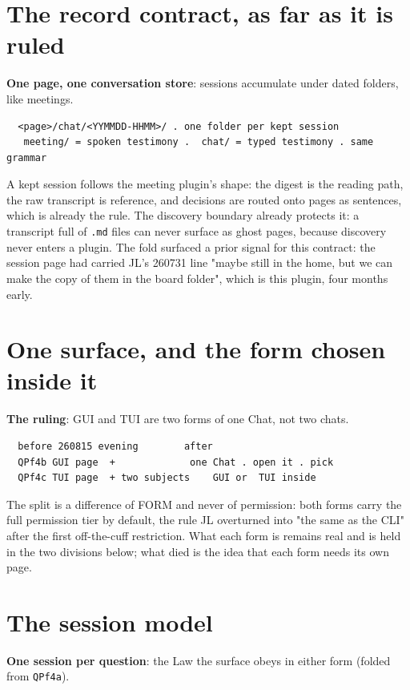 
\section{The record contract, as far as it is ruled}
\textbf{One page, one conversation store}: sessions accumulate under dated folders, like meetings.

\begin{verbatim}
  <page>/chat/<YYMMDD-HHMM>/ . one folder per kept session
   meeting/ = spoken testimony .  chat/ = typed testimony . same grammar
\end{verbatim}
A kept session follows the meeting plugin's shape: the digest is the reading path, the raw transcript is reference, and decisions are routed onto pages as sentences, which is already the rule. The discovery boundary already protects it: a transcript full of \texttt{.md} files can never surface as ghost pages, because discovery never enters a plugin. The fold surfaced a prior signal for this contract: the session page had carried JL's 260731 line "maybe still in the home, but we can make the copy of them in the board folder", which is this plugin, four months early.


\section{One surface, and the form chosen inside it}
\textbf{The ruling}: GUI and TUI are two forms of one Chat, not two chats.

\begin{verbatim}
  before 260815 evening        after
  QPf4b GUI page  +             one Chat . open it . pick
  QPf4c TUI page  + two subjects    GUI or  TUI inside
\end{verbatim}
The split is a difference of FORM and never of permission: both forms carry the full permission tier by default, the rule JL overturned into "the same as the CLI" after the first off-the-cuff restriction. What each form is remains real and is held in the two divisions below; what died is the idea that each form needs its own page.


\section{The session model}
\textbf{One session per question}: the Law the surface obeys in either form (folded from \texttt{QPf4a}).

